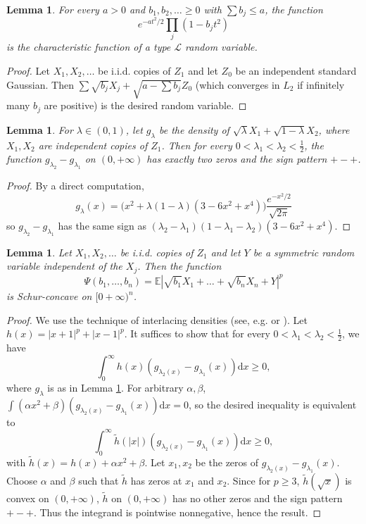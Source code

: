 \documentclass[10pt]{article}
\newcommand{\dd}{\mathrm{d}}
\newcommand{\E}{\mathbb{E}}
\newcommand{\1}{\textbf{1}}
\newcommand{\sL}{\mathscr{L}}
\newtheorem{lemma}[theorem]{Lemma}
\theoremstyle{remark}
\theoremstyle{definition}
\begin{document}
\begin{lemma}\label{lm:ch.f.}
For every $a > 0$ and $b_1, b_2, \ldots \geq 0$ with $\sum b_j \leq a$, the function
\[
e^{-at^2/2}\prod_j (1-b_jt^2)
\]
is the characteristic function of a type $\sL$ random variable.
\end{lemma}
\begin{proof}
Let $X_1, X_2, \ldots$ be i.i.d. copies of $Z_1$ and let $Z_0$ be an independent standard Gaussian. Then $\sum \sqrt{b_j}X_j + \sqrt{a-\sum b_j}Z_0$ (which converges in $L_2$ if infinitely many $b_j$ are positive) is the desired random variable. 
\end{proof}





\begin{lemma}\label{lm:interlacing}
For $\lambda \in (0,1)$, let $g_\lambda$ be the density of $\sqrt{\lambda}X_1 + \sqrt{1-\lambda}X_2$, where $X_1, X_2$ are independent copies of $Z_1$. Then for every $0 < \lambda_1 < \lambda_2 < \frac{1}{2}$, the function $g_{\lambda_2} - g_{\lambda_1}$ on $(0,+\infty)$ has exactly two zeros and the sign pattern $+-+$.
\end{lemma}
\begin{proof}
By a direct computation, 
\[g_\lambda(x) = \Big(x^2+\lambda(1-\lambda)(3-6x^2+x^4)\Big)\frac{e^{-x^2/2}}{\sqrt{2\pi}}
\]
so $g_{\lambda_2} - g_{\lambda_1}$ has the same sign as $(\lambda_2-\lambda_1)(1-\lambda_1-\lambda_2)(3-6x^2+x^4)$.
\end{proof}



\begin{lemma}\label{lm:schur}
Let $X_1, X_2, \dots$ be i.i.d. copies of $Z_1$ and let $Y$ be a symmetric random variable independent of the $X_j$. Then the function
\[
\Psi(b_1,\dots,b_n) = \E|\sqrt{b_1}X_1+\dots+\sqrt{b_n}X_n + Y|^p
\]
is Schur-concave on $[0+\infty)^n$.
\end{lemma}
\begin{proof}
We use the technique of interlacing densities (see, e.g. \cite{ENT2} or \cite{NZ}). Let $h(x) = |x+1|^p+|x-1|^p$. It suffices to show that for every $0 < \lambda_1 < \lambda_2 < \frac{1}{2}$, we have
\[
\int_0^\infty h(x)(g_{\lambda_2(x)} - g_{\lambda_1}(x)) \dd x \geq 0,
\]
where $g_\lambda$ is as in Lemma \ref{lm:interlacing}. For arbitrary $\alpha, \beta$, $\int (\alpha x^2+\beta)(g_{\lambda_2(x)} - g_{\lambda_1}(x)) \dd x = 0$, so the desired inequality is equivalent to 
\[
\int_0^\infty \tilde h(|x|)(g_{\lambda_2(x)} - g_{\lambda_1}(x)) \dd x \geq 0,
\]
with $\tilde h(x) = h(x) + \alpha x^2 + \beta$. Let $x_1, x_2$ be the zeros of $g_{\lambda_2(x)} - g_{\lambda_1}(x)$. Choose $\alpha$ and $\beta$ such that $\tilde h$ has zeros at $x_1$ and $x_2$. Since for $p \geq 3$, $\tilde h(\sqrt{x})$ is convex on $(0,+\infty)$, $\tilde h$ on $(0,+\infty)$ has no other zeros and the sign pattern $+-+$. Thus the integrand is pointwise nonnegative, hence the result.
\end{proof}
\end{document}
